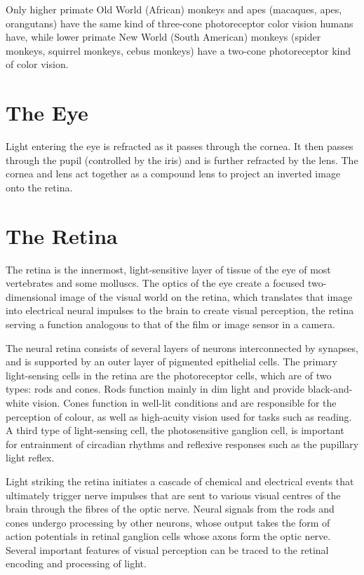 Only higher primate Old World (African) monkeys and apes (macaques, apes, orangutans) have the same kind of three-cone photoreceptor color vision humans have, while lower primate New World (South American) monkeys (spider monkeys, squirrel monkeys, cebus monkeys) have a two-cone photoreceptor kind of color vision.

\hypertarget{the-eye}{%
\section{The Eye}\label{the-eye}}

Light entering the eye is refracted as it passes through the cornea. It then passes through the pupil (controlled by the iris) and is further refracted by the lens. The cornea and lens act together as a compound lens to project an inverted image onto the retina.

\hypertarget{the-retina}{%
\section{The Retina}\label{the-retina}}

The retina is the innermost, light-sensitive layer of tissue of the eye of most vertebrates and some molluscs. The optics of the eye create a focused two-dimensional image of the visual world on the retina, which translates that image into electrical neural impulses to the brain to create visual perception, the retina serving a function analogous to that of the film or image sensor in a camera.

The neural retina consists of several layers of neurons interconnected by synapses, and is supported by an outer layer of pigmented epithelial cells. The primary light-sensing cells in the retina are the photoreceptor cells, which are of two types: rods and cones. Rods function mainly in dim light and provide black-and-white vision. Cones function in well-lit conditions and are responsible for the perception of colour, as well as high-acuity vision used for tasks such as reading. A third type of light-sensing cell, the photosensitive ganglion cell, is important for entrainment of circadian rhythms and reflexive responses such as the pupillary light reflex.

Light striking the retina initiates a cascade of chemical and electrical events that ultimately trigger nerve impulses that are sent to various visual centres of the brain through the fibres of the optic nerve. Neural signals from the rods and cones undergo processing by other neurons, whose output takes the form of action potentials in retinal ganglion cells whose axons form the optic nerve. Several important features of visual perception can be traced to the retinal encoding and processing of light.

